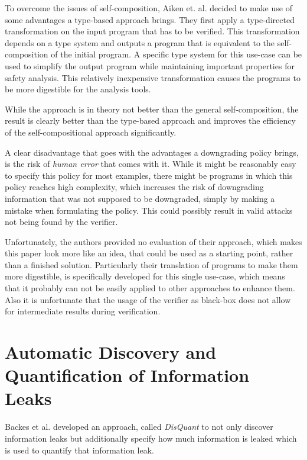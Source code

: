 \documentclass[a4paper,UKenglish]{lipics-v2018}
\begin{document}
To overcome the issues of self-composition, Aiken et. al. decided to make use of some advantages a type-based approach brings. They first apply a type-directed transformation on the input program that has to be verified. This transformation depends on a type system and outputs a program that is equivalent to the self-composition of the initial program. A specific type system for this use-case can be used to simplify the output program while maintaining important properties for safety analysis. This relatively inexpensive transformation causes the programs to be more digestible for the analysis tools. 
\cite{secure_information_flow_safety}

While the approach is in theory not better than the general self-composition, the result is clearly better than the type-based approach and improves the efficiency of the self-compositional approach significantly.
\cite{secure_information_flow_safety}

A clear disadvantage that goes with the advantages a downgrading policy brings, is the risk of \textit{human error} that comes with it. While it might be reasonably easy to specify this policy for most examples, there might be programs in which this policy reaches high complexity, which increases the risk of downgrading information that was not supposed to be downgraded, simply by making a mistake when formulating the policy. This could possibly result in valid attacks not being found by the verifier.

Unfortunately, the authors provided no evaluation of their approach, which makes this paper look more like an idea, that could be used as a starting point, rather than a finished solution. Particularly their translation of programs to make them more digestible, is specifically developed for this single use-case, which means that it probably can not be easily applied to other approaches to enhance them. Also it is unfortunate that the usage of the verifier as black-box does not allow for intermediate results during verification.




\section{Automatic Discovery and Quantification of Information Leaks}

Backes et al. developed an approach, called \textit{DisQuant} to not only discover information leaks but additionally specify how much information is leaked which is used to quantify that information leak.\cite{automatic_discovery_and_quantification}
\end{document}
